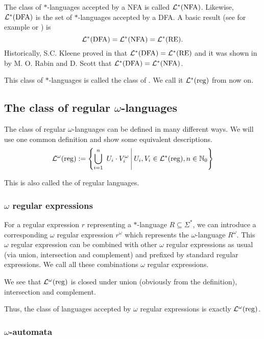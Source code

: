The class of $*$-languages accepted by a NFA is called $\mathcal{L}^*(\text{NFA})$. Likewise, $\mathcal{L}^*(\text{DFA})$ is the set of $*$-languages accepted by a DFA. A basic result (see for example \cite{FinAutLogR109} or \cite{InfWordsR110}) is
\[ \mathcal{L}^*(\text{DFA}) = \mathcal{L}^*(\text{NFA}) = \mathcal{L}^*(\text{RE}) . \]
Historically, S.C. Kleene proved in \cite{Kleene56} that $\mathcal{L}^*(\text{DFA}) = \mathcal{L}^*(\text{RE}) $ and it was shown in \cite{FinAutRabin59} by M. O. Rabin and D. Scott that $\mathcal{L}^*(\text{DFA}) = \mathcal{L}^*(\text{NFA})$.

This class of $*$-languages is called the class of . We call it $\mathcal{L}^*(\textup{\textrm{reg}})$ from now on.



\subsection{The class of regular $\omega$-languages}
\label{reg-omega-lang}

The class of regular $\omega$-languages can be defined in many different ways. We will use one common definition and show some equivalent descriptions.
\[ \LangOreg := \Set{ \bigcup_{i=1}^n\ U_i \cdot V_i^\omega }{ U_i, V_i \in \Langreg, n \in \N_0 } \]

This is also called the  of regular languages.

\subsubsection{$\omega$ regular expressions}

For a regular expression $r$ representing a $*$-language $R\subseteq \Sigma^*$, we can introduce a corresponding $\omega$ regular expression $r^\omega$ which represents the $\omega$-language $R^\omega$. This $\omega$ regular expression can be combined with other $\omega$ regular expressions as usual (via union, intersection and complement) and prefixed by standard regular expressions. We call all these combinations $\omega$ regular expressions.

We see that $\mathcal{L}^\omega(\textup{\textrm{reg}})$ is closed under union (obviously from the definition), intersection and complement.

Thus, the class of languages accepted by $\omega$ regular expressions is exactly $\mathcal{L}^\omega(\textup{\textrm{reg}})$.


\subsubsection{$\omega$-automata}

